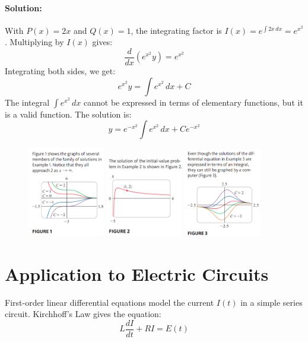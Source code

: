 \documentclass{article}
\begin{document}
\paragraph{Solution:}
With $P(x)=2x$ and $Q(x)=1$, the integrating factor is $I(x) = e^{\int 2x \, dx} = e^{x^2}$. Multiplying by $I(x)$ gives:
\[\frac{d}{dx}(e^{x^2}y) = e^{x^2}\]
Integrating both sides, we get:
\[e^{x^2}y = \int e^{x^2} \, dx + C\]
The integral $\int e^{x^2} \, dx$ cannot be expressed in terms of elementary functions, but it is a valid function. The solution is:
\[y = e^{-x^2} \int e^{x^2} \, dx + Ce^{-x^2}\]
\begin{figure}[htbp]
    \centering
    \includegraphics[width=0.3\textwidth]{graph5.png}
    \includegraphics[width=0.3\textwidth]{graph6.png} 
    \includegraphics[width=0.3\textwidth]{graph7.png} %
\end{figure}

\section*{Application to Electric Circuits}
First-order linear differential equations model the current $I(t)$ in a simple series circuit. Kirchhoff's Law gives the equation:
\[L \frac{dI}{dt} + RI = E(t)\]
\end{document}
